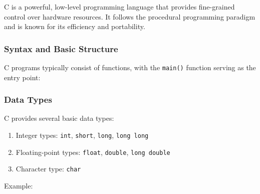 C is a powerful, low-level programming language that provides
fine-grained control over hardware resources. It follows the procedural
programming paradigm and is known for its efficiency and portability.

\hypertarget{syntax-and-basic-structure-1}{%
\subsubsection{Syntax and Basic
Structure}\label{syntax-and-basic-structure-1}}

C programs typically consist of functions, with the \texttt{main()}
function serving as the entry point:

\begin{Shaded}
\begin{Highlighting}[]

\NormalTok{);}
     \NormalTok{;}
\NormalTok{\}}
\end{Highlighting}
\end{Shaded}

\hypertarget{data-types-1}{%
\subsubsection{Data Types}\label{data-types-1}}

C provides several basic data types:

\begin{enumerate}
\def\labelenumi{\arabic{enumi}.}
\tightlist
\item
  Integer types: \texttt{int}, \texttt{short}, \texttt{long},
  \texttt{long\ long}
\item
  Floating-point types: \texttt{float}, \texttt{double},
  \texttt{long\ double}
\item
  Character type: \texttt{char}
\end{enumerate}

Example:

\begin{Shaded}
\begin{Highlighting}[]
\NormalTok{;}
\NormalTok{;}
\NormalTok{;}
\end{Highlighting}
\end{Shaded}

